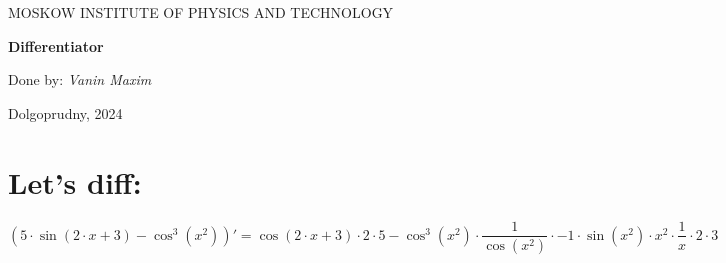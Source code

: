 \documentclass[a4paper,12pt]{article}
\date{}
\begin{document}
\begin{titlepage}
\begin{center}
	\textsc{MOSKOW INSTITUTE OF PHYSICS AND TECHNOLOGY}
	\vspace{2ex}

\end{center}
\vspace{10ex}
\begin{center}
	\vspace{24ex}

	\vspace{2ex}
	\textbf{\Large{Differentiator}}
	\vspace{34ex}
	\begin{flushright}
	\noindent
	Done by:
	\textit{Vanin Maxim}
	\end{flushright}
	\vfill
	Dolgoprudny, 2024
\end{center}
\end{titlepage}
\newpage
\section{Let's diff:}
\begin{center}
	$$( 5 \cdot\sin( 2 \cdot x + 3 )-\cos^{ 3 }( x ^ 2 ))' = \cos( 2 \cdot x + 3 )\cdot 2 \cdot 5 -\cos^{ 3 }( x ^ 2 )\cdot\frac 1 {\cos( x ^ 2 )}\cdot -1 \cdot\sin( x ^ 2 )\cdot x ^ 2 \cdot\frac 1  x \cdot 2 \cdot 3 $$
\end{center}
\end{document}
